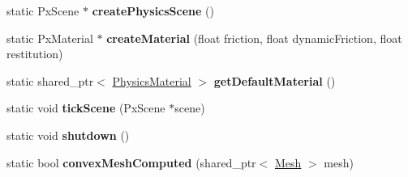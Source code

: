 \begin{DoxyCompactItemize}
\item 
\hypertarget{class_physics_a0860be4d01d8f3ac3091bce1f4fd6654}{}static Px\+Scene $\ast$ {\bfseries create\+Physics\+Scene} ()\label{class_physics_a0860be4d01d8f3ac3091bce1f4fd6654}

\item 
\hypertarget{class_physics_a5c3d81bc67f81136181db76358b0ede7}{}static Px\+Material $\ast$ {\bfseries create\+Material} (float friction, float dynamic\+Friction, float restitution)\label{class_physics_a5c3d81bc67f81136181db76358b0ede7}

\item 
\hypertarget{class_physics_af324ec30b84e67fbe463f0a14d491b50}{}static shared\+\_\+ptr$<$ \hyperlink{class_physics_material}{Physics\+Material} $>$ {\bfseries get\+Default\+Material} ()\label{class_physics_af324ec30b84e67fbe463f0a14d491b50}

\item 
\hypertarget{class_physics_ac8d328e039f44a45b08742d35e434c94}{}static void {\bfseries tick\+Scene} (Px\+Scene $\ast$scene)\label{class_physics_ac8d328e039f44a45b08742d35e434c94}

\item 
\hypertarget{class_physics_a9594de74882adb25ce75ebc8b34fd6ce}{}static void {\bfseries shutdown} ()\label{class_physics_a9594de74882adb25ce75ebc8b34fd6ce}

\item 
\hypertarget{class_physics_a351ceac4e3a916796cc3b89c49133664}{}static bool {\bfseries convex\+Mesh\+Computed} (shared\+\_\+ptr$<$ \hyperlink{class_mesh}{Mesh} $>$ mesh)\label{class_physics_a351ceac4e3a916796cc3b89c49133664}

\end{DoxyCompactItemize}
